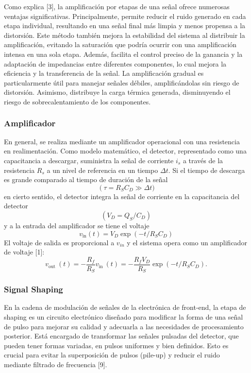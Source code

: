 \documentclass[]{book}
\begin{document}
\noindent Como explica [3], la amplificación por etapas de una señal ofrece numerosas ventajas significativas. Principalmente, permite reducir el ruido generado en cada etapa individual, resultando en una señal final más limpia y menos propensa a la distorsión. Este método también mejora la estabilidad del sistema al distribuir la amplificación, evitando la saturación que podría ocurrir con una amplificación intensa en una sola etapa. Además, facilita el control preciso de la ganancia y la adaptación de impedancias entre diferentes componentes, lo cual mejora la eficiencia y la transferencia de la señal. La amplificación gradual es particularmente útil para manejar señales débiles, amplificándolas sin riesgo de distorsión. Asimismo, distribuye la carga térmica generada, disminuyendo el riesgo de sobrecalentamiento de los componentes. \\

\subsubsection{Amplificador}

\noindent En general, se realiza mediante un amplificador operacional con una resistencia en realimentación. Como modelo matemático, el detector, representado como una capacitancia a descargar, suministra la señal de corriente $i_{s}$ a través de la resistencia $R_{s}$ a un nivel de referencia en un tiempo $\Delta t$. Si el tiempo de descarga es grande comparado al tiempo de duración de la señal $$\left(\tau=R_S C_D \gg\right. \Delta t)$$ en cierto sentido, el detector integra la señal de corriente en la capacitancia del detector $$\left(V_D=Q_S / C_D\right)$$ y a la entrada del amplificador se tiene el voltaje $$v_{\text{in}}(t)=V_D \exp \left(-t / R_S C_D\right)$$ El voltaje de salida es proporcional a $v_{i n}$ y el sistema opera como un amplificador de voltaje [1]:
$$
v_{\text {out }}(t)=-\frac{R_f}{R_S} v_{\text {in }}(t)=-\frac{R_f V_D}{R_S} \exp \left(-t / R_S C_D\right) .
$$

\subsubsection{Signal Shaping}

\noindent En la cadena de modulación de señales de la electrónica de front-end, la etapa de shaping es un circuito electrónico diseñado para modificar la forma de una señal de pulso para mejorar su calidad y adecuarla a las necesidades de procesamiento posterior. Está encargado de transformar las señales pulsadas del detector, que pueden tener formas variadas, en pulsos uniformes y bien definidos. Esto es crucial para evitar la superposición de pulsos (pile-up) y reducir el ruido mediante filtrado de frecuencia [9].\\
\end{document}
